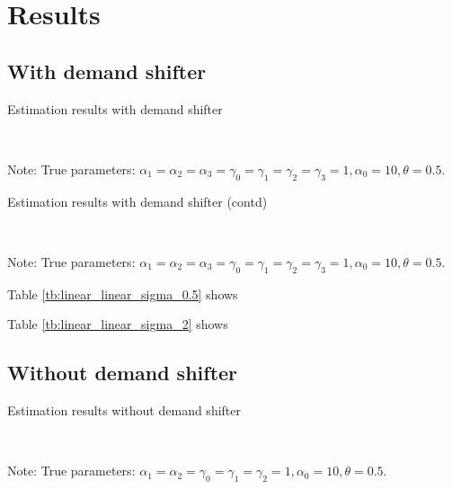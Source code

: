 \documentclass[11pt, a4paper]{article}
\begin{document}
\section{Results}


\subsection{With demand shifter}

\begin{table}[!htbp]
  \begin{center}
      \caption{Estimation results with demand shifter}
      \label{tb:linear_linear_sigma_0.5} 
      \subfloat[$\sigma=0.001$]{}\\
      \subfloat[$\sigma=0.5$]{}
  \end{center}\footnotesize
  Note: True parameters: $\alpha_1 = \alpha_2 = \alpha_3 = \gamma_0 = \gamma_1 = \gamma_2  = \gamma_3 = 1, \alpha_0 = 10, \theta = 0.5.$
\end{table} 

\begin{table}[!htbp]
  \begin{center}
      \caption{Estimation results  with demand shifter (contd)}
      \label{tb:linear_linear_sigma_2} 
      \subfloat[$\sigma=1.0$]{}\\
      \subfloat[$\sigma=2.0$]{}
  \end{center}\footnotesize
  Note: True parameters: $\alpha_1 = \alpha_2 = \alpha_3 = \gamma_0 = \gamma_1 = \gamma_2  = \gamma_3 = 1, \alpha_0 = 10, \theta = 0.5.$
\end{table} 

Table \ref{tb:linear_linear_sigma_0.5} shows

Table \ref{tb:linear_linear_sigma_2} shows



\subsection{Without demand shifter}

\begin{table}[!htbp]
  \begin{center}
      \caption{Estimation results without demand shifter}
      \label{tb:linear_linear_sigma_0.5_without_demand_shifter_y} 
      \subfloat[$\sigma=0.001$]{}\\
      \subfloat[$\sigma=0.5$]{}
  \end{center}\footnotesize
  Note: True parameters: $\alpha_1 = \alpha_2 =  \gamma_0 = \gamma_1 = \gamma_2  =  1, \alpha_0 = 10, \theta = 0.5.$
\end{table} 
\end{document}
